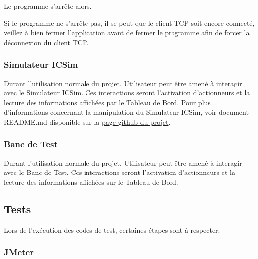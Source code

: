 Le programme {\nomLogiciel} s'arrête alors.

Si le programme ne s'arrête pas, il se peut que le client TCP soit encore connecté, veillez à bien fermer l'application {\nomApplication} avant de fermer le programme {\nomLogiciel} afin de forcer la déconnexion du client TCP.

\subsubsection{Simulateur ICSim}
Durant l'utilisation normale du projet, Utilisateur peut être amené à interagir avec le Simulateur ICSim. Ces interactions seront l'activation d'actionneurs et la lecture des informations affichées par le Tableau de Bord.
\newline
Pour plus d'informations concernant la manipulation du Simulateur ICSim, voir document README.md disponible sur la {\href{https://github.com/zombieCraig/ICSim}{page github du projet}}.

\subsubsection{Banc de Test}
Durant l'utilisation normale du projet, Utilisateur peut être amené à interagir avec le Banc de Test. Ces interactions seront l'activation d'actionneurs et la lecture des informations affichées sur le Tableau de Bord.

\subsection{Tests}
Lors de l'exécution des codes de test, certaines étapes sont à respecter.

\subsubsection{JMeter}

